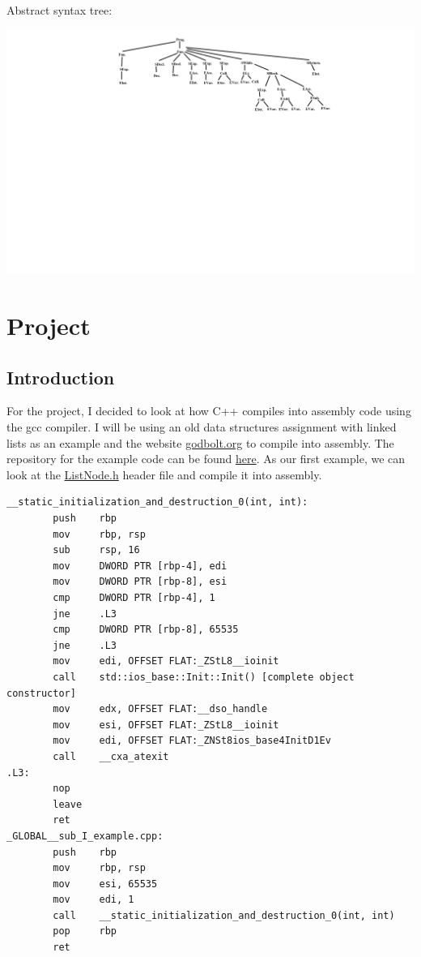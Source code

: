 \documentclass{article}
\theoremstyle{theorem}
\theoremstyle{definition}
\theoremstyle{remark}
\begin{document}
Abstract syntax tree:

\includegraphics[scale=0.3]{Images/FibAbstractTree.png}

\section{Project}

\subsection{Introduction}

\par For the project, I decided to look at how C++ compiles into assembly code using the gcc compiler. I will be using an old data structures assignment with linked lists as an example and the website \href{https://godbolt.org/}{godbolt.org} to compile into assembly. The repository for the example code can be found \href{https://github.com/s3t6b912/CPSC350-Assignment4/tree/master/src}{here}. As our first example, we can look at the  \href{https://github.com/s3t6b912/CPSC350-Assignment4/blob/master/src/ListNode.h}{ListNode.h} header file and compile it into assembly.

\begin{lstlisting}
__static_initialization_and_destruction_0(int, int):
        push    rbp
        mov     rbp, rsp
        sub     rsp, 16
        mov     DWORD PTR [rbp-4], edi
        mov     DWORD PTR [rbp-8], esi
        cmp     DWORD PTR [rbp-4], 1
        jne     .L3
        cmp     DWORD PTR [rbp-8], 65535
        jne     .L3
        mov     edi, OFFSET FLAT:_ZStL8__ioinit
        call    std::ios_base::Init::Init() [complete object constructor]
        mov     edx, OFFSET FLAT:__dso_handle
        mov     esi, OFFSET FLAT:_ZStL8__ioinit
        mov     edi, OFFSET FLAT:_ZNSt8ios_base4InitD1Ev
        call    __cxa_atexit
.L3:
        nop
        leave
        ret
_GLOBAL__sub_I_example.cpp:
        push    rbp
        mov     rbp, rsp
        mov     esi, 65535
        mov     edi, 1
        call    __static_initialization_and_destruction_0(int, int)
        pop     rbp
        ret
\end{lstlisting}
\end{document}
